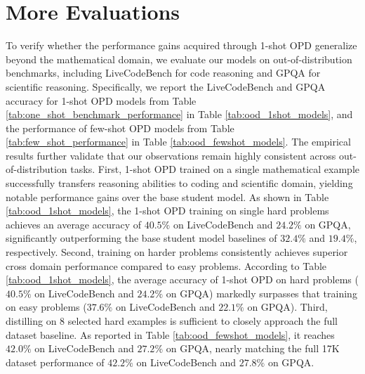 \section{More Evaluations} \label{app:ood}
To verify whether the performance gains acquired through 1-shot OPD generalize beyond the mathematical domain, we evaluate our models on out-of-distribution benchmarks, including LiveCodeBench for code reasoning and GPQA for scientific reasoning. Specifically, we report the LiveCodeBench and GPQA accuracy for 1-shot OPD models from Table \ref{tab:one_shot_benchmark_performance} in Table \ref{tab:ood_1shot_models}, and the performance of few-shot OPD models from Table \ref{tab:few_shot_performance} in Table \ref{tab:ood_fewshot_models}. The empirical results further validate that our observations remain highly consistent across out-of-distribution tasks. First, 1-shot OPD trained on a single mathematical example successfully transfers reasoning abilities to coding and scientific domain, yielding notable performance gains over the base student model. As shown in Table \ref{tab:ood_1shot_models}, the 1-shot OPD training on single hard problems achieves an average accuracy of $40.5\%$ on LiveCodeBench and $24.2\%$ on GPQA, significantly outperforming the base student model baselines of $32.4\%$ and $19.4\%$, respectively. Second, training on harder problems consistently achieves superior cross domain performance compared to easy problems. According to Table \ref{tab:ood_1shot_models}, the average accuracy of 1-shot OPD on hard problems ($40.5\%$ on LiveCodeBench and $24.2\%$ on GPQA) markedly surpasses that training on easy problems ($37.6\%$ on LiveCodeBench and $22.1\%$ on GPQA). Third, distilling on 8 selected hard examples is sufficient to closely approach the full dataset baseline. As reported in Table \ref{tab:ood_fewshot_models}, it reaches $42.0\%$ on LiveCodeBench and $27.2\%$ on GPQA, nearly matching the full 17K dataset performance of $42.2\%$ on LiveCodeBench and $27.8\%$ on GPQA.

